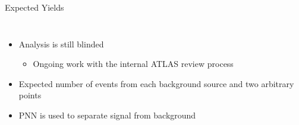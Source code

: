 \documentclass[aspectratio=169,xcolor=table]{beamer}
\begin{document}
    \begin{frame}[t]{Expected Yields}
      \begin{columns}

        \begin{itemize}
          \item Analysis is still blinded
          \begin{itemize}
            \item Ongoing work with the internal ATLAS review process
          \end{itemize}
          \item Expected number of events from each background source and two arbitrary \mHpm points
          \item PNN is used to separate signal from background
        \end{itemize}


\end{columns}
\end{frame}
\end{document}
